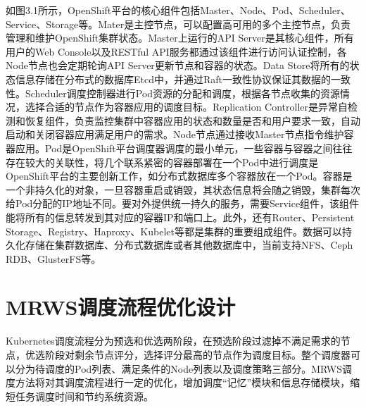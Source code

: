 如图3.1所示，OpenShift平台的核心组件包括Master、Node、Pod、Scheduler、Service、Storage等。Mater是主控节点，可以配置高可用的多个主控节点，负责管理和维护OpenShift集群状态。Master上运行的API Server是其核心组件，所有用户的Web Console以及RESTful API服务都通过该组件进行访问认证控制，各Node节点也会定期轮询API Server更新节点和容器的状态。Data Store将所有的状态信息存储在分布式的数据库Etcd中，并通过Raft一致性协议保证其数据的一致性。Scheduler调度控制器进行Pod资源的分配和调度，根据各节点收集的资源情况，选择合适的节点作为容器应用的调度目标。Replication Controller是异常自检测和恢复组件，负责监控集群中容器应用的状态和数量是否和用户要求一致，自动启动和关闭容器应用满足用户的需求。Node节点通过接收Master节点指令维护容器应用。Pod是OpenShift平台调度器调度的最小单元，一些容器与容器之间往往存在较大的关联性，将几个联系紧密的容器部署在一个Pod中进行调度是OpenShift平台的主要创新工作，如分布式数据库多个容器放在一个Pod。容器是一个非持久化的对象，一旦容器重启或销毁，其状态信息将会随之销毁，集群每次给Pod分配的IP地址不同。要对外提供统一持久的服务，需要Service组件，该组件能将所有的信息转发到其对应的容器IP和端口上。此外，还有Router、Persistent Storage、Registry、Haproxy、Kubelet等都是集群的重要组成组件。数据可以持久化存储在集群数据库、分布式数据库或者其他数据库中，当前支持NFS、Ceph RDB、GlusterFS等。

\section{MRWS调度流程优化设计}
Kubernetes调度流程分为预选和优选两阶段，在预选阶段过滤掉不满足需求的节点，优选阶段对剩余节点评分，选择评分最高的节点作为调度目标。整个调度器可以分为待调度的Pod列表、满足条件的Node列表以及调度策略三部分。MRWS调度方法将对其调度流程进行一定的优化，增加调度“记忆”模块和信息存储模块，缩短任务调度时间和节约系统资源。

